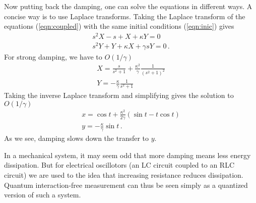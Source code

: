\documentclass[prb,preprint]{revtex4-1}
\begin{document}
Now putting back the damping, one can solve the equations in different
ways.  A concise way is to use Laplace transforms.  Taking the Laplace
transform of the equations (\ref{eqn:coupled}) with the same initial
conditions (\ref{eqn:inic}) gives
\begin{equation}
\begin{array}{l}
s^2 X - s + X + \kappa Y = 0 \\
s^2 Y + Y + \kappa X + \gamma s Y = 0 \,.
\end{array}
\end{equation}
For strong damping, we have to $O(1/\gamma)$
\begin{equation}
\begin{array}{l}
\displaystyle
X = \frac s{s^2+1} + \frac{\kappa^2}\gamma \frac1{(s^2+1)^2} \\
\displaystyle
Y = -\frac\kappa\gamma \frac1{s^2+1}
\end{array}
\end{equation}
Taking the inverse Laplace transform and simplifying gives the
solution to $O(1/\gamma)$
\begin{equation}
\begin{array}{l}
\displaystyle
x = \cos t + \frac{\kappa^2}{2\gamma} (\sin t - t\cos t) \\
\displaystyle
y = -\frac\kappa\gamma \sin t \,.
\end{array}
\end{equation}
As we see, damping slows down the transfer to $y$.

In a mechanical system, it may seem odd that more damping means less
energy dissipation.  But for electrical oscillotors (an LC circuit
coupled to an RLC circuit) we are used to the idea that increasing
resistance reduces dissipation.  Quantum interaction-free measurement
can thus be seen simply as a quantized version of such a system.



\newpage

\def\vmargin{\hrule height 1cm width 0pt}


\def\pgfbeamsplitter(#1,#2)#3{\pgfputat{\pgfxy(#1,#2)}
                              {\pgfbox[center,center]#3
                               \pgfxyline(-1.1,0)(0,1.1)
                               \pgfxyline(0,1.1)(1.1,0)
                               \pgfxyline(1.1,0)(0,-1.1)
                               \pgfxyline(0,-1.1)(-1.1,0)}}

\def\pgfbeamsplitter(#1,#2)#3{\pgfputat{\pgfxy(#1,#2)}
                              {\pgfbox[center,center]#3
                               \pgfxyline(-1.1,0)(0,1.1)
                               \pgfxyline(0,1.1)(1.1,0)
                               \pgfxyline(1.1,0)(0,-1.1)
                               \pgfxyline(0,-1.1)(-1.1,0)}}
\end{document}
